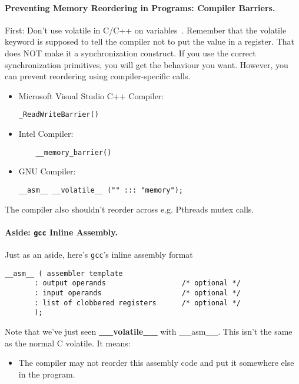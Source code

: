 \paragraph{Preventing Memory Reordering in Programs: Compiler Barriers.}
First: Don't use volatile in C/C++ on variables~\cite{so:volatile}. Remember that the volatile keyword is supposed to tell the compiler not to put the value in a register. That does NOT make it a synchronization construct. If you use the correct synchronization primitives, you will get the behaviour you want. However, you can prevent reordering using compiler-specific calls.

\begin{itemize}
  \item Microsoft Visual Studio C++ Compiler:
  \begin{verbatim}
_ReadWriteBarrier()
  \end{verbatim}
  \item Intel Compiler:
  \begin{verbatim}
    __memory_barrier()
  \end{verbatim}
  \item GNU Compiler:
  \begin{verbatim}
__asm__ __volatile__ ("" ::: "memory");
  \end{verbatim}
\end{itemize}

The compiler also shouldn't reorder across e.g. Pthreads mutex calls.

\paragraph{Aside: {\tt gcc} Inline Assembly.}
Just as an aside, here's {\tt gcc}'s inline assembly format

  \begin{verbatim}
__asm__ ( assembler template 
       : output operands                  /* optional */
       : input operands                   /* optional */
       : list of clobbered registers      /* optional */
       );
  \end{verbatim}

Note that we've just seen {\bf \_\_volatile\_\_} with  \_\_asm\_\_. This isn't the same as the normal C volatile. It means:
\begin{itemize}
    \item The compiler may not reorder this assembly code and put it somewhere
      else in the program.
\end{itemize}

